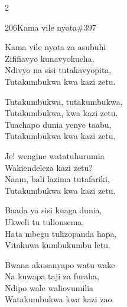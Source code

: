 \begin{multicols}{2}
\begin{hymn}{206}{Kama vile nyota}{\#397}
\begin{stanza}
Kama vile nyota za asubuhi\\
Zififiavyo kunavyokucha,\\
Ndivyo na sisi tutakavyopita,\\
Tutakumbukwa kwa kazi zetu.
\end{stanza}
\begin{chorus}
Tutakumbukwa, tutakumbukwa,\\
Tutakumbukwa, kwa kazi zetu.\\
Tuachapo dunia yenye taabu,\\
Tutakumbukwa kwa kazi zetu.
\end{chorus}
\begin{stanza}
Je! wengine watatuhurumia\\
Wakiendeleza kazi zetu?\\
Naam, bali lazima tutafariki,\\
Tutakumbukwa kwa kazi zetu.
\end{stanza}
\begin{stanza}
Baada ya sisi kuaga dunia,\\
Ukweli tu tuliousema,\\
Hata mbegu tulizopanda hapa,\\
Vitakuwa kumbukumbu letu.
\end{stanza}
\begin{stanza}
Bwana akusanyapo watu wake\\
Na kuwapa taji za furaha,\\
Ndipo wale waliovumilia\\
Watakumbukwa kwa kazi zao.
\end{stanza}
\end{hymn}


\end{multicols}
